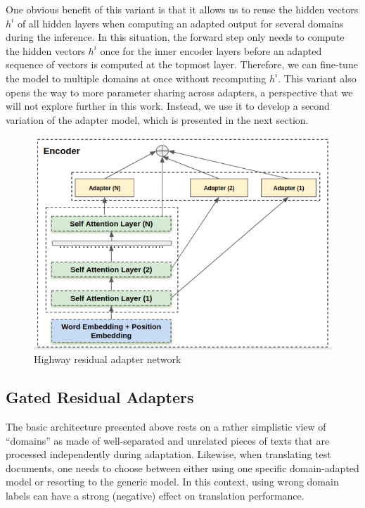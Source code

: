 One obvious benefit of this variant is that it allows us to reuse the hidden vectors $h^i$ of all hidden layers when computing an adapted output for several domains during the inference. In this situation, the forward step only needs to compute the hidden vectors $h^i$ once for the inner encoder layers before an adapted sequence of vectors is computed at the topmost layer. Therefore, we can fine-tune the model to multiple domains at once without recomputing $h^i$. This variant also opens the way to more parameter sharing across adapters, a perspective that we will not explore further in this work. Instead, we use it to develop a second variation of the adapter model, which is presented in the next section.

\begin{figure}[htbp]
  \centering
  \includegraphics[scale=0.3]{graphics/highway_residual}
  \caption{Highway residual adapter network}
  \label{fig:hrl-architecture-chap6}
\end{figure}

\subsection{Gated Residual Adapters \label{ssec:gate-chap6}}
The basic architecture presented above rests on a rather simplistic view of ``domains'' as made of well-separated and unrelated pieces of texts that are processed independently during adaptation. Likewise, when translating test documents, one needs to choose between either using one specific domain-adapted model or resorting to the generic model. In this context, using wrong domain labels can have a strong (negative) effect on translation performance. 

